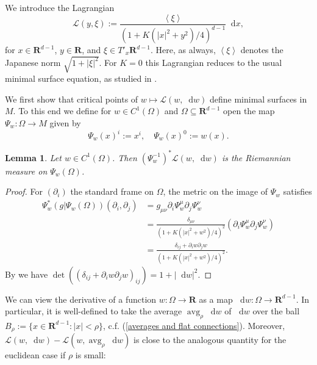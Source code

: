 \documentclass[reqno,10pt]{amsart}
\newcommand{\RR}{\mathbf{R}}
\DeclareMathOperator{\avg}{avg}
\newcommand*\dif{\mathop{}\!\mathrm{d}}
\newcommand{\Lagrange}{\mathscr L}
\def\Japan#1{\left \langle #1 \right \rangle}
\newtheorem{lemma}[theorem]{Lemma}
\theoremstyle{definition}
\numberwithin{equation}{section}
\begin{document}
We introduce the Lagrangian
$$\Lagrange(y, \xi) := \frac{\Japan{\xi}}{(1 + K(|x|^2 + y^2)/4)^{d - 1}} \dif x,$$
for $x \in \RR^{d - 1}$, $y \in \RR$, and $\xi \in T'_x \RR^{d - 1}$.
Here, as always, $\Japan \xi$ denotes the Japanese norm $\sqrt{1 + |\xi|^2}$.
For $K = 0$ this Lagrangian reduces to the usual minimal surface equation, as studied in \cite[\S6]{Giusti77}.

We first show that critical points of $w \mapsto \Lagrange(w, \dif w)$ define minimal surfaces in $M$.
To this end we define for $w \in C^1(\Omega)$ and $\Omega \subseteq \RR^{d - 1}$ open the map $\Psi_w: \Omega \to M$ given by
$$\Psi_w(x)^i := x^i, \quad \Psi_w(x)^0 := w(x).$$

\begin{lemma}\label{Plateau setup lemma}
Let $w \in C^1(\Omega)$. Then $(\Psi_w^{-1})^* \Lagrange(w, \dif w)$ is the Riemannian measure on $\Psi_w(\Omega)$.
\end{lemma}
\begin{proof}
For $(\partial_i)$ the standard frame on $\Omega$, the metric on the image of $\Psi_w$ satisfies
\begin{align*}
\Psi_w^*(g|\Psi_w(\Omega))(\partial_i, \partial_j) &= g_{\mu\nu} \partial_i \Psi_w^\mu \partial_j \Psi_w^\nu \\
&= \frac{\delta_{\mu\nu}}{(1 + K(|x|^2 + w^2)/4)^2} (\partial_i \Psi_w^\mu \partial_j \Psi_w^\nu) \\
&= \frac{\delta_{ij} + \partial_i w \partial_j w}{(1 + K(|x|^2 + w^2)/4)^2}.
\end{align*}
By \cite[(24)]{Petersen2008} we have $\det((\delta_{ij} + \partial_i w \partial_j w)_{ij}) = 1 + |\dif w|^2$.
\end{proof}

We can view the derivative of a function $w: \Omega \to \RR$ as a map $\dif w: \Omega \to \RR^{d - 1}$.
In particular, it is well-defined to take the average $\avg_\rho \dif w$ of $\dif w$ over the ball $B_\rho := \{x \in \RR^{d - 1}: |x| < \rho\}$, c.f. (\ref{averages and flat connections}).
Moreover, $\Lagrange(w, \dif w) - \Lagrange(w, \avg_\rho \dif w)$ is close to the analogous quantity for the euclidean case if $\rho$ is small:
\end{document}
